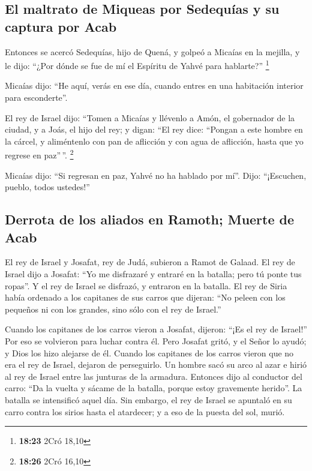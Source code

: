 \hypertarget{el-maltrato-de-miqueas-por-sedequuxedas-y-su-captura-por-acab}{%
\subsection{El maltrato de Miqueas por Sedequías y su captura por
Acab}\label{el-maltrato-de-miqueas-por-sedequuxedas-y-su-captura-por-acab}}

 Entonces se acercó Sedequías, hijo de Quená, y golpeó a
Micaías en la mejilla, y le dijo: ``¿Por dónde se fue de mí el Espíritu
de Yahvé para hablarte?'' \footnote{\textbf{18:23} 2Cró 18,10}

 Micaías dijo: ``He aquí, verás en ese día, cuando entres
en una habitación interior para esconderte''.

 El rey de Israel dijo: ``Tomen a Micaías y llévenlo a
Amón, el gobernador de la ciudad, y a Joás, el hijo del rey;
 y digan: ``El rey dice: ``Pongan a este hombre en la
cárcel, y aliméntenlo con pan de aflicción y con agua de aflicción,
hasta que yo regrese en paz''\,''. \footnote{\textbf{18:26} 2Cró 16,10}

 Micaías dijo: ``Si regresan en paz, Yahvé no ha hablado
por mí''. Dijo: ``¡Escuchen, pueblo, todos ustedes!''

\hypertarget{derrota-de-los-aliados-en-ramoth-muerte-de-acab}{%
\subsection{Derrota de los aliados en Ramoth; Muerte de
Acab}\label{derrota-de-los-aliados-en-ramoth-muerte-de-acab}}

 El rey de Israel y Josafat, rey de Judá, subieron a
Ramot de Galaad.  El rey de Israel dijo a Josafat: ``Yo
me disfrazaré y entraré en la batalla; pero tú ponte tus ropas''. Y el
rey de Israel se disfrazó, y entraron en la batalla.  El
rey de Siria había ordenado a los capitanes de sus carros que dijeran:
``No peleen con los pequeños ni con los grandes, sino sólo con el rey de
Israel.''

 Cuando los capitanes de los carros vieron a Josafat,
dijeron: ``¡Es el rey de Israel!'' Por eso se volvieron para luchar
contra él. Pero Josafat gritó, y el Señor lo ayudó; y Dios los hizo
alejarse de él.  Cuando los capitanes de los carros
vieron que no era el rey de Israel, dejaron de perseguirlo.
 Un hombre sacó su arco al azar e hirió al rey de Israel
entre las junturas de la armadura. Entonces dijo al conductor del carro:
``Da la vuelta y sácame de la batalla, porque estoy gravemente herido''.
 La batalla se intensificó aquel día. Sin embargo, el rey
de Israel se apuntaló en su carro contra los sirios hasta el atardecer;
y a eso de la puesta del sol, murió.

